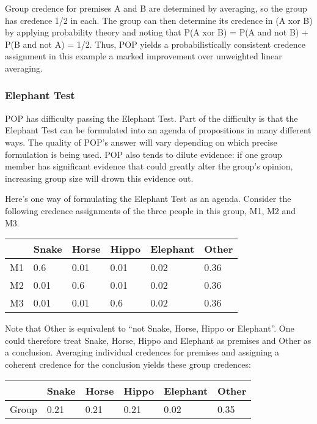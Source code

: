 \documentclass{article}
\begin{document}
Group credence for premises A and B are determined by averaging, so the group has credence 1/2 in each. The group can then determine its credence in (A xor B) by applying probability theory and noting that P(A xor B) = P(A and not B) + P(B and not A) = 1/2. Thus, POP yields a probabilistically consistent credence assignment in this example \textemdash{} a marked improvement over unweighted linear averaging. 

\subsubsection{Elephant Test}

POP has difficulty passing the Elephant Test. Part of the difficulty is that the Elephant Test can be formulated into an agenda of propositions in many different ways. The quality of POP's answer will vary depending on which precise formulation is being used. POP also tends to dilute evidence: if one group member has significant evidence that could greatly alter the group's opinion, increasing group size will drown this evidence out.

Here's one way of formulating the Elephant Test as an agenda. Consider the following credence assignments of the three people in this group, M1, M2 and M3. 

\begin{center}
\begin{tabular}{ | l | l | l | l | l | l |}
  \hline 
     & Snake & Horse & Hippo & Elephant & Other \\ \hline
  M1 & 0.6 & 0.01 & 0.01 & 0.02 & 0.36 \\ \hline
  M2 & 0.01 & 0.6 & 0.01 & 0.02 & 0.36 \\ \hline
  M3 & 0.01 & 0.01 & 0.6 & 0.02 & 0.36 \\ \hline
\end{tabular}
\end{center}

\noindent
Note that Other is equivalent to ``not Snake, Horse, Hippo or Elephant''. One could therefore treat Snake, Horse, Hippo and Elephant as premises and Other as a conclusion. Averaging individual credences for premises and assigning a coherent credence for the conclusion yields these group credences:

\begin{center}
\begin{tabular}{ | l | l | l | l | l | l |}
  \hline 
     & Snake & Horse & Hippo & Elephant & Other \\ \hline
  Group & 0.21 & 0.21 & 0.21 & 0.02 & 0.35 \\ \hline
\end{tabular}
\end{center}
\end{document}
